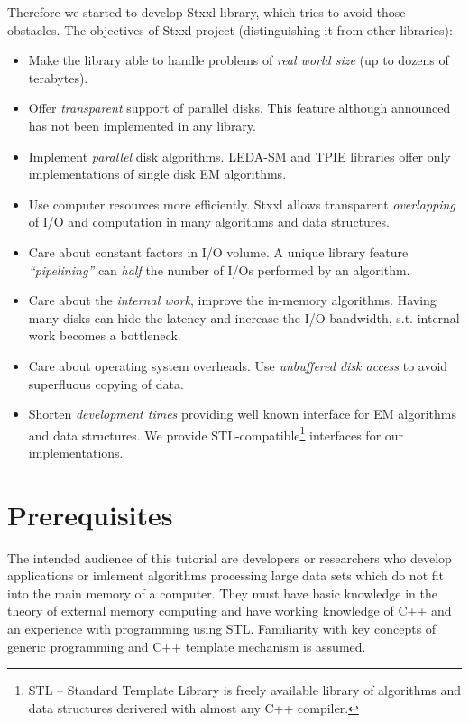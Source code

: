 \documentclass[twoside]{book}
\newcommand{\stxxl}{{\sc Stxxl} }
\begin{document}
Therefore we started to develop \stxxl library, which tries to avoid
those obstacles. The objectives of \stxxl project (distinguishing
it from other libraries): 
\begin{itemize}
\item Make the library able to handle problems of \emph{real world size}
(up to dozens of terabytes). 

\item Offer \emph{transparent} support of parallel disks. This feature
although announced has not been implemented in any library.
\item Implement \emph{parallel} disk algorithms. LEDA-SM and TPIE
libraries offer only implementations of single disk EM algorithms.
\item Use computer resources more efficiently. \stxxl allows 
transparent \emph{overlapping} of I/O and computation in many algorithms and
data structures.
\item Care about constant factors in I/O volume. A unique library
feature \emph{``pipelining''} can \emph{half} the number of I/Os
performed by an algorithm.
\item Care about the \emph{internal work}, improve the in-memory
algorithms. Having many disks can hide the latency and increase the
I/O bandwidth, s.t. internal work becomes a bottleneck.
\item Care about operating system overheads. Use \emph{unbuffered disk
access} to avoid superfluous copying of data.
\item Shorten \emph{development times} providing well known interface for EM
algorithms and data structures. We provide STL-compatible\footnote{STL
-- Standard Template Library \cite{stepanov94standard} is freely available library of
algorithms and data structures derivered with almost any C++
compiler.} interfaces for our implementations.
\end{itemize}

\chapter{Prerequisites}

The intended audience of this tutorial are developers or researchers who
develop applications or imlement algorithms processing large data sets
which do not fit into the main memory of a computer. They must have
basic knowledge in the theory of external memory computing and 
have working knowledge of C++ and an experience with programming using
STL. Familiarity with key concepts of generic programming and
C++ template mechanism is assumed.
\end{document}
